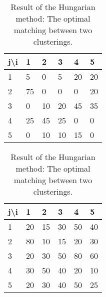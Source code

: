 \begin{table}[h]
    \centering
    \begin{tabular}{|l | l l l l l |}
    \hline
    j\textbackslash i & 1 & 2 & 3 & 4 & 5\\ \hline
    1 & 5 & \cellcolor{blue!25}0 & 5 & 20 & 20\\
    2 & 75 & 0 & \cellcolor{blue!25}0 & 0 & 20\\
    3 & \cellcolor{blue!25}0 & 10 & 20 & 45 & 35\\
    4 & 25 & 45 & 25 & \cellcolor{blue!25}0 & 0\\
    5 & 0 & 10 & 10 & 15 & \cellcolor{blue!25}0\\ \hline
    \end{tabular}
    \begin{tabular}{|l | l l l l l|}
        \hline
        j\textbackslash i & 1 & 2 & 3 & 4 & 5\\ \hline
        1 & 20 & \cellcolor{blue!25}15 & 30 & 50 & 40\\
        2 & 80 & 10 & \cellcolor{blue!25}15 & 20 & 30\\
        3 & \cellcolor{blue!25}20 & 30 & 50 & 80 & 60\\
        4 & 30 & 50 & 40 & \cellcolor{blue!25}20 & 10\\
        5 & 20 & 30 & 40 & 50 & \cellcolor{blue!25}25\\ \hline
    \end{tabular}
    \caption{Result of the Hungarian method: The optimal matching between two clusterings.}
    \label{app:hung:assignment}
\end{table}